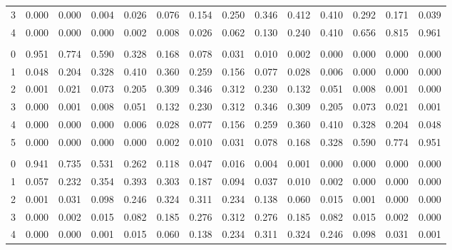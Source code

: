 \documentclass[
]{article}
\begin{document}
\begin{longtable}[t]{lrrrrrrrrrrrrr}
\hspace{1em}3 & 0.000 & 0.000 & 0.004 & 0.026 & 0.076 & 0.154 & 0.250 & 0.346 & 0.412 & 0.410 & 0.292 & 0.171 & 0.039\\
\hspace{1em}4 & 0.000 & 0.000 & 0.000 & 0.002 & 0.008 & 0.026 & 0.062 & 0.130 & 0.240 & 0.410 & 0.656 & 0.815 & 0.961\\
\addlinespace[0.3em]
\multicolumn{14}{l}{$n=5$}\\
\hspace{1em}0 & 0.951 & 0.774 & 0.590 & 0.328 & 0.168 & 0.078 & 0.031 & 0.010 & 0.002 & 0.000 & 0.000 & 0.000 & 0.000\\
\hspace{1em}1 & 0.048 & 0.204 & 0.328 & 0.410 & 0.360 & 0.259 & 0.156 & 0.077 & 0.028 & 0.006 & 0.000 & 0.000 & 0.000\\
\hspace{1em}2 & 0.001 & 0.021 & 0.073 & 0.205 & 0.309 & 0.346 & 0.312 & 0.230 & 0.132 & 0.051 & 0.008 & 0.001 & 0.000\\
\hspace{1em}3 & 0.000 & 0.001 & 0.008 & 0.051 & 0.132 & 0.230 & 0.312 & 0.346 & 0.309 & 0.205 & 0.073 & 0.021 & 0.001\\
\hspace{1em}4 & 0.000 & 0.000 & 0.000 & 0.006 & 0.028 & 0.077 & 0.156 & 0.259 & 0.360 & 0.410 & 0.328 & 0.204 & 0.048\\
\hspace{1em}5 & 0.000 & 0.000 & 0.000 & 0.000 & 0.002 & 0.010 & 0.031 & 0.078 & 0.168 & 0.328 & 0.590 & 0.774 & 0.951\\
\addlinespace[0.3em]
\multicolumn{14}{l}{$n=6$}\\
\hspace{1em}0 & 0.941 & 0.735 & 0.531 & 0.262 & 0.118 & 0.047 & 0.016 & 0.004 & 0.001 & 0.000 & 0.000 & 0.000 & 0.000\\
\hspace{1em}1 & 0.057 & 0.232 & 0.354 & 0.393 & 0.303 & 0.187 & 0.094 & 0.037 & 0.010 & 0.002 & 0.000 & 0.000 & 0.000\\
\hspace{1em}2 & 0.001 & 0.031 & 0.098 & 0.246 & 0.324 & 0.311 & 0.234 & 0.138 & 0.060 & 0.015 & 0.001 & 0.000 & 0.000\\
\hspace{1em}3 & 0.000 & 0.002 & 0.015 & 0.082 & 0.185 & 0.276 & 0.312 & 0.276 & 0.185 & 0.082 & 0.015 & 0.002 & 0.000\\
\hspace{1em}4 & 0.000 & 0.000 & 0.001 & 0.015 & 0.060 & 0.138 & 0.234 & 0.311 & 0.324 & 0.246 & 0.098 & 0.031 & 0.001\\

\end{longtable}
\end{document}
